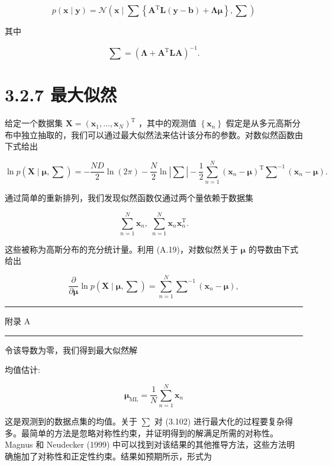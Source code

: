\documentclass[10pt]{article}
\newcommand{\HRule}{\begin{center}\rule{0.9\linewidth}{0.2mm}\end{center}}
\begin{document}
\[
p\left( {\mathbf{x} \mid  \mathbf{y}}\right)  = \mathcal{N}\left( {\mathbf{x} \mid  \mathbf{\sum }\left\{  {{\mathbf{A}}^{\mathrm{T}}\mathbf{L}\left( {\mathbf{y} - \mathbf{b}}\right)  + \mathbf{\Lambda }\mathbf{\mu }}\right\}  ,\mathbf{\sum }}\right)  \tag{3.100}
\]

其中

\[
\mathbf{\sum } = {\left( \mathbf{\Lambda } + {\mathbf{A}}^{\mathrm{T}}\mathbf{{LA}}\right) }^{-1}. \tag{3.101}
\]

\section*{3.2.7 最大似然}

给定一个数据集 \(\mathbf{X} = {\left( {\mathbf{x}}_{1},\ldots ,{\mathbf{x}}_{N}\right) }^{\mathrm{T}}\) ，其中的观测值 \(\left\{  {\mathbf{x}}_{n}\right\}\) 假定是从多元高斯分布中独立抽取的，我们可以通过最大似然法来估计该分布的参数。对数似然函数由下式给出

\[
\ln p\left( {\mathbf{X} \mid  \mathbf{\mu },\mathbf{\sum }}\right)  =  - \frac{ND}{2}\ln \left( {2\pi }\right)  - \frac{N}{2}\ln \left| \mathbf{\sum }\right|  - \frac{1}{2}\mathop{\sum }\limits_{{n = 1}}^{N}{\left( {\mathbf{x}}_{n} - \mathbf{\mu }\right) }^{\mathrm{T}}{\mathbf{\sum }}^{-1}\left( {{\mathbf{x}}_{n} - \mathbf{\mu }}\right) . \tag{3.102}
\]

通过简单的重新排列，我们发现似然函数仅通过两个量依赖于数据集

\[
\mathop{\sum }\limits_{{n = 1}}^{N}{\mathbf{x}}_{n},\;\mathop{\sum }\limits_{{n = 1}}^{N}{\mathbf{x}}_{n}{\mathbf{x}}_{n}^{\mathrm{T}}. \tag{3.103}
\]

这些被称为高斯分布的充分统计量。利用 (A.19)，对数似然关于 \(\mathbf{\mu }\) 的导数由下式给出

\[
\frac{\partial }{\partial \mathbf{\mu }}\ln p\left( {\mathbf{X} \mid  \mathbf{\mu },\mathbf{\sum }}\right)  = \mathop{\sum }\limits_{{n = 1}}^{N}{\mathbf{\sum }}^{-1}\left( {{\mathbf{x}}_{n} - \mathbf{\mu }}\right) , \tag{3.104}
\]

\HRule

附录 A

\HRule

令该导数为零，我们得到最大似然解

均值估计:

\[
{\mathbf{\mu }}_{\mathrm{{ML}}} = \frac{1}{N}\mathop{\sum }\limits_{{n = 1}}^{N}{\mathbf{x}}_{n} \tag{3.105}
\]

这是观测到的数据点集的均值。关于 \(\sum\) 对 (3.102) 进行最大化的过程要复杂得多。最简单的方法是忽略对称性约束，并证明得到的解满足所需的对称性。Magnus 和 Neudecker (1999) 中可以找到对该结果的其他推导方法，这些方法明确施加了对称性和正定性约束。结果如预期所示，形式为
\end{document}
